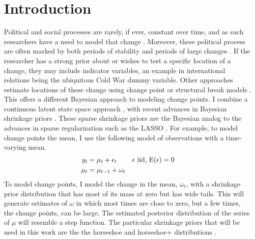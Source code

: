 
\newcommand{\ModelII}[1]{\texttt{#1}}


\section{Introduction}
\label{dlm:sec:introduction}

Political and social processes are rarely, if ever, constant over time, and as such researchers have a need to model that change \parencites{Buethe2002a}{Lieberman2002a}.
Moreover, these political process are often marked by both periods of stability and periods of large changes \parencites{Pierson2004}.
If the researcher has a strong prior about or wishes to test a specific location of a change, they may include indicator variables, an example in international relations being the ubiquitous Cold War dummy variable.
Other approaches estimate locations of these change using change point or structural break models \parencites{CalderiaZorn1998}{WesternKleykamp2004}{Spirling2007a}{Spirling2007b}{Park2010}{Park2011}{Blackwell2012}.
This offers a different Bayesian approach to modeling change points.
I combine a continuous latent state space approach \parencite{Beck1989}, with recent advances in Bayesian shrinkage priors \parencites{CarvalhoPolsonScott2009}{CarvalhoPolsonScott2010}{PolsonScott2010}.
These sparse shrinkage priors are the Bayesian analog to the advances in sparse regularization such as the LASSO \parencites{Tibshirani1996}.
For example, to model change points the mean, I use the following model of observations with a time-varying mean.
\begin{equation}
  \label{dlm:eq:31}
  \begin{aligned}[t]
  y_{t} &= \mu_{t} + \epsilon_{t} & \text{$\epsilon$ iid, $\operatorname{E}(\epsilon) = 0$} \\
  \mu_{t} &= \mu_{t - 1} + \omega_{t}
  \end{aligned}
\end{equation}
To model change points, I model the change in the mean, $\omega_{t}$, with a shrinkage prior distribution that has most of its mass at zero but has wide tails.
This will generate estimates of $\omega$ in which most times are close to zero, but a few times, the change points, can be large.
The estimated posterior distribution of the series of $\mu$ will resemble a step function.
The particular shrinkage priors that will be used in this work are the the horseshoe and horseshoe+ distributions \parencites{CarvalhoPolsonScott2009}{CarvalhoPolsonScott2010}{BhadraDattaPolsonEtAl2015a}.

